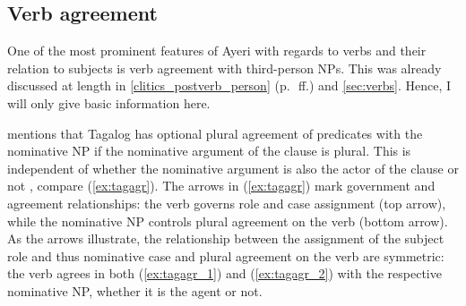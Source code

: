 \subsection{Verb agreement}
\label{subsec:verbagr}

One of the most prominent features of Ayeri with regards to verbs and their
relation to subjects is verb agreement with third-person NPs. This was already
discussed at length in \autoref{clitics_postverb_person} 
(p.~\pageref{clitics_postverb_person}\,ff.) and \autoref{sec:verbs}. Hence, I
will only give basic information here.

\citet{kroeger1991} mentions that Tagalog has optional plural agreement of
predicates with the nominative NP if the nominative argument of the clause is
plural. This is independent of whether the nominative argument is also the
actor of the clause or not \citep[24--25]{kroeger1991}, compare
(\ref{ex:tagagr}). The arrows in (\ref{ex:tagagr}) mark government and
agreement relationships: the verb governs role and case assignment (top arrow),
while the nominative NP controls plural agreement on the verb (bottom arrow).
As the arrows illustrate, the relationship between the assignment of the
subject role and thus nominative case and plural agreement on the verb are
symmetric: the verb agrees in both (\ref{ex:tagagr_1}) and (\ref{ex:tagagr_2})
with the respective nominative NP, whether it is the agent or not.

